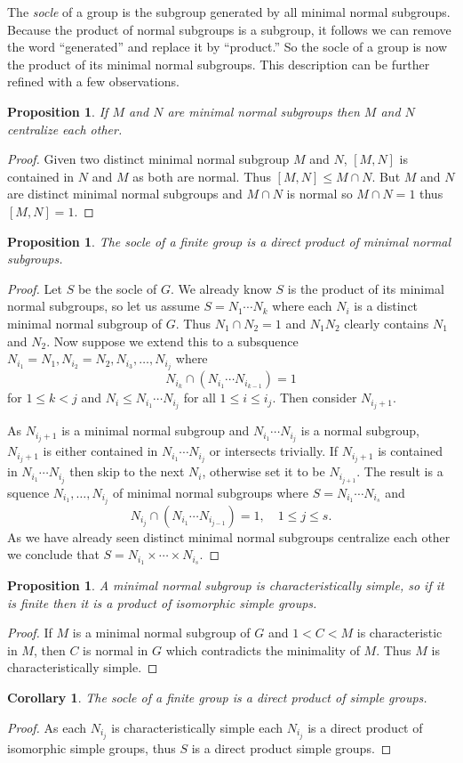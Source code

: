 \documentclass[12pt]{article}
\newtheorem{coro}[thm]{Corollary}
\newtheorem{prop}[thm]{Proposition}
\providecommand{\intersect}{\cap}
\begin{document}
The \emph{socle} of a group is the subgroup generated by all minimal normal subgroups.  
Because the product of normal subgroups is a subgroup, it follows we can remove the word ``generated'' and replace it by ``product.''  So the socle of a group is now the product of its minimal normal subgroups.  This description can be further refined with a few observations.

\begin{prop}
If $M$ and $N$ are minimal normal subgroups then $M$ and $N$ centralize 
each other.
\end{prop}
\begin{proof}
Given two distinct minimal normal subgroup $M$ and $N$, $[M,N]$ is contained in $N$ and $M$ as both are normal.  Thus $[M,N]\leq M\cap N$.  But $M$ and $N$ are distinct minimal normal subgroups and $M\cap N$ is normal so $M\cap N=1$ thus $[M,N]=1$. 
\end{proof}

\begin{prop}
The socle of a finite group is a direct product of minimal normal subgroups.
\end{prop}
\begin{proof}
Let $S$ be the socle of $G$.  We already know $S$ is the product of its minimal normal subgroups, so let us assume $S=N_1\cdots N_k$ where each $N_i$ is a distinct minimal normal subgroup of $G$.  Thus $N_1\intersect N_2=1$ and
$N_1 N_2$ clearly contains $N_1$ and $N_2$.  Now suppose we extend this to a
subsquence $N_{i_1}=N_1, N_{i_2}=N_2,N_{i_3},\dots,N_{i_j}$ where
\[N_{i_{k}}\intersect(N_{i_1}\cdots N_{i_{k-1}})=1\]
for $1\leq k<j$ and $N_i\leq N_{i_1}\cdots N_{i_j}$ for all $1\leq i\leq i_j$.
Then consider $N_{i_j +1}$.  

As $N_{i_j +1}$ is a minimal normal subgroup and $N_{i_1}\cdots N_{i_j}$ is a
normal subgroup, $N_{i_j +1}$ is either contained in $N_{i_1}\cdots N_{i_j}$
or intersects trivially.  If $N_{i_j +1}$ is contained in $N_{i_1}\cdots N_{i_j}$ then skip to the next $N_i$, otherwise set it to be $N_{i_{j+1}}$.
The result is a squence $N_{i_1},\dots,N_{i_j}$ of minimal normal subgroups
where $S=N_{i_1}\cdots N_{i_s}$ and
\[N_{i_j}\intersect(N_{i_1}\cdots N_{i_{j-1}})=1,\quad 1\leq j\leq s.\]
As we have already seen distinct minimal normal subgroups centralize each other
we conclude that $S=N_{i_1}\times\cdots \times N_{i_s}$.
\end{proof}

\begin{prop}
A minimal normal subgroup is characteristically simple, so if it is finite then it is a product of isomorphic simple groups.
\end{prop}
\begin{proof}
If $M$ is a minimal normal subgroup of $G$ and $1<C<M$ is characteristic in $M$, then $C$ is normal in $G$ which contradicts the minimality of $M$.  Thus $M$ is characteristically simple.
\end{proof}

\begin{coro}
The socle of a finite group is a direct product of simple groups.
\end{coro}
\begin{proof}
As each $N_{i_j}$ is characteristically simple each $N_{i_j}$ is a direct product of isomorphic simple groups, thus $S$ is a direct product simple groups.
\end{proof}

\end{document}
